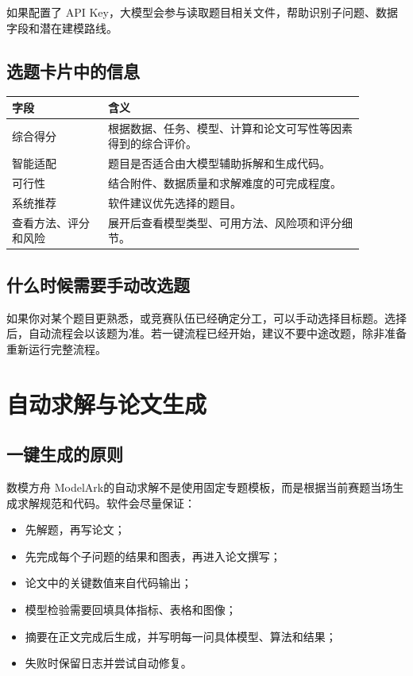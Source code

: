\documentclass[UTF8,a4paper,12pt]{ctexart}
\newcommand{\app}{数模方舟 ModelArk}
\begin{document}
如果配置了 API Key，大模型会参与读取题目相关文件，帮助识别子问题、数据字段和潜在建模路线。

\subsection{选题卡片中的信息}

\begin{longtable}{p{0.24\linewidth}p{0.64\linewidth}}
\toprule
字段 & 含义 \\
\midrule
综合得分 & 根据数据、任务、模型、计算和论文可写性等因素得到的综合评价。 \\
智能适配 & 题目是否适合由大模型辅助拆解和生成代码。 \\
可行性 & 结合附件、数据质量和求解难度的可完成程度。 \\
系统推荐 & 软件建议优先选择的题目。 \\
查看方法、评分和风险 & 展开后查看模型类型、可用方法、风险项和评分细节。 \\
\bottomrule
\end{longtable}

\subsection{什么时候需要手动改选题}

如果你对某个题目更熟悉，或竞赛队伍已经确定分工，可以手动选择目标题。选择后，自动流程会以该题为准。若一键流程已经开始，建议不要中途改题，除非准备重新运行完整流程。

\section{自动求解与论文生成}

\subsection{一键生成的原则}

\app 的自动求解不是使用固定专题模板，而是根据当前赛题当场生成求解规范和代码。软件会尽量保证：

\begin{itemize}
  \item 先解题，再写论文；
  \item 先完成每个子问题的结果和图表，再进入论文撰写；
  \item 论文中的关键数值来自代码输出；
  \item 模型检验需要回填具体指标、表格和图像；
  \item 摘要在正文完成后生成，并写明每一问具体模型、算法和结果；
  \item 失败时保留日志并尝试自动修复。
\end{itemize}
\end{document}
